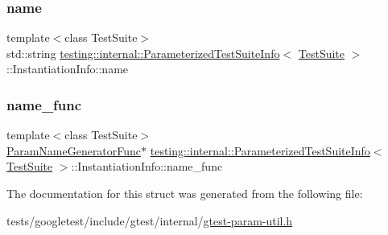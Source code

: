 \mbox{\label{structtesting_1_1internal_1_1ParameterizedTestSuiteInfo_1_1InstantiationInfo_a7e66a4d302537389c8c8efcc9acbe826}} 
\subsubsection{\texorpdfstring{name}{name}}
{\footnotesize\ttfamily template$<$class Test\+Suite$>$ \\
std\+::string \hyperlink{classtesting_1_1internal_1_1ParameterizedTestSuiteInfo}{testing\+::internal\+::\+Parameterized\+Test\+Suite\+Info}$<$ \hyperlink{classtesting_1_1TestSuite}{Test\+Suite} $>$\+::Instantiation\+Info\+::name}

\mbox{\label{structtesting_1_1internal_1_1ParameterizedTestSuiteInfo_1_1InstantiationInfo_a754244a7055f2d8c83b1b5e1656afe5f}} 
\subsubsection{\texorpdfstring{name\+\_\+func}{name\_func}}
{\footnotesize\ttfamily template$<$class Test\+Suite$>$ \\
\hyperlink{classtesting_1_1internal_1_1ParameterizedTestSuiteInfo_a3b4f232b7d6d3df941bb8e81b6b534a4}{Param\+Name\+Generator\+Func}$\ast$ \hyperlink{classtesting_1_1internal_1_1ParameterizedTestSuiteInfo}{testing\+::internal\+::\+Parameterized\+Test\+Suite\+Info}$<$ \hyperlink{classtesting_1_1TestSuite}{Test\+Suite} $>$\+::Instantiation\+Info\+::name\+\_\+func}



The documentation for this struct was generated from the following file\+:\begin{DoxyCompactItemize}
\item 
tests/googletest/include/gtest/internal/\hyperlink{gtest-param-util_8h}{gtest-\/param-\/util.\+h}\end{DoxyCompactItemize}
